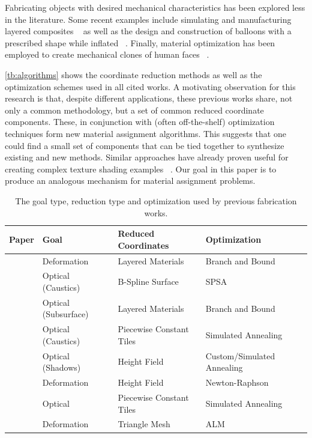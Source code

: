 \documentclass[annual]{acmsiggraph}
\begin{document}
Fabricating objects with desired mechanical characteristics has been explored less in the literature. Some recent examples include simulating and manufacturing layered composites ~\cite{Bickel:2010} as well as the design and construction of balloons with a prescribed shape while inflated ~\cite{sko:2012}. Finally, material optimization has been employed to create mechanical clones of human faces ~\cite{Bickel:2012}.

\autoref{tb:algorithms} shows the coordinate reduction methods as well as the optimization schemes used in all cited works. A motivating observation for this research is that, despite different applications, these previous works share, not only a common methodology, but a set of common reduced coordinate components. These, in conjunction with (often off-the-shelf) optimization techniques form new material assignment algorithms. This suggests that one could find a small set of components that can be tied together to synthesize existing and new methods. Similar approaches have already proven useful for creating complex texture shading examples ~\cite{Cook1984}. Our goal in this paper is to produce an analogous mechanism for material assignment problems. 
\begin{table}[htp]
\centering
\caption{The goal type, reduction type and optimization used by previous fabrication works.}
\begin{tabular}{clll}
\hline
\textbf{Paper} & \textbf{Goal} & \textbf{Reduced Coordinates}  & \textbf{Optimization} \\ 
\hline
~\cite{Bickel:2010}& Deformation & Layered Materials  & Branch and Bound \\
~\cite{Finckh:2010} & Optical (Caustics) & B-Spline Surface & SPSA \\
~\cite{Hasan:2010}& Optical (Subsurface) & Layered Materials & Branch and Bound\\ 
~\cite{Marios:2011} & Optical (Caustics) & Piecewise Constant Tiles & Simulated Annealing \\
~\cite{Bermano:2012} & Optical (Shadows) & Height Field & Custom/Simulated Annealing \\
~\cite{Bickel:2012} & Deformation &  Height Field &  Newton-Raphson \\
~\cite{Papas:2012} & Optical & Piecewise Constant Tiles & Simulated Annealing \\
~\cite{sko:2012}& Deformation & Triangle Mesh & ALM \\
\hline
\end{tabular}
\label{tb:algorithms}
\end{table}
\end{document}
